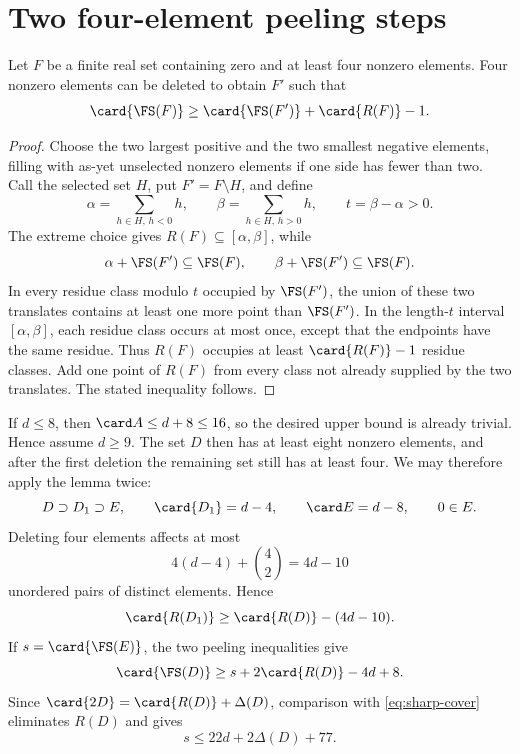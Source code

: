 \section{Two four-element peeling steps}\label{sec:peeling}

\begin{lemma}\label{lem:peeling}
Let $F$ be a finite real set containing zero and at least four nonzero
elements.  Four nonzero elements can be deleted to obtain $F'$ such that
\[
 \card{\FS(F)}\geq\card{\FS(F')}+\card{R(F)}-1.
\]
\end{lemma}

\begin{proof}
Choose the two largest positive and the two smallest negative elements,
filling with as-yet unselected nonzero elements if one side has fewer than
two.  Call the selected set $H$, put $F'=F\setminus H$, and define
\[
 \alpha=\sum_{h\in H,\,h<0}h,
 \qquad \beta=\sum_{h\in H,\,h>0}h,
 \qquad t=\beta-\alpha>0.
\]
The extreme choice gives $R(F)\subseteq[\alpha,\beta]$, while
\[
 \alpha+\FS(F')\subseteq\FS(F),
 \qquad \beta+\FS(F')\subseteq\FS(F).
\]
In every residue class modulo $t$ occupied by $\FS(F')$, the union of these
two translates contains at least one more point than $\FS(F')$.  In the
length-$t$ interval $[\alpha,\beta]$, each residue class occurs at most once,
except that the endpoints have the same residue.  Thus $R(F)$ occupies at
least $\card{R(F)}-1$ residue classes.  Add one point of $R(F)$ from every
class not already supplied by the two translates.  The stated inequality
follows.
\end{proof}

If $d\leq8$, then $\card A\leq d+8\leq16$, so the desired upper bound is
already trivial.  Hence assume $d\geq9$.  The set $D$ then has at least eight
nonzero elements, and after the first deletion the remaining set still has at
least four.  We may therefore apply the lemma twice:
\[
 D\supset D_1\supset E,
 \qquad \card{D_1}=d-4,
 \qquad \card E=d-8,
 \qquad 0\in E.
\]
Deleting four elements affects at most
\[
 4(d-4)+\binom42=4d-10
\]
unordered pairs of distinct elements.  Hence
\[
 \card{R(D_1)}\geq\card{R(D)}-(4d-10).
\]
If $s=\card{\FS(E)}$, the two peeling inequalities give
\begin{equation}
 \card{\FS(D)}\geq s+2\card{R(D)}-4d+8.
 \label{eq:peel-lower}
\end{equation}
Since $\card{2D}=\card{R(D)}+\Delta(D)$, comparison with
\eqref{eq:sharp-cover} eliminates $R(D)$ and gives
\begin{equation}
 \boxed{s\leq22d+2\Delta(D)+77.}
 \label{eq:core-upper}
\end{equation}


